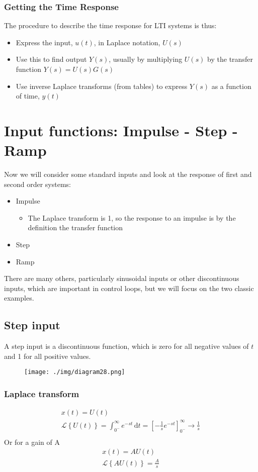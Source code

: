 \subsubsection{Getting the Time Response}
The procedure to describe the time response for LTI systems is thus:
\begin{itemize}
  \item Express the input, $u(t)$, in Laplace notation, $U(s)$
  \item Use this to find output $Y(s)$, usually by multiplying $U(s)$ by the transfer function $Y(s) = U(s)G(s)$
  \item Use inverse Laplace transforms (from tables) to express $Y(s)$ as a function of time, $y(t)$
\end{itemize}
\section{Input functions: Impulse - Step - Ramp}
Now we will consider some standard inputs and look at the response of first and second order systems:
\begin{itemize}
  \item Impulse
        \begin{itemize}
          \item The Laplace transform is 1, so the response to an impulse is by the definition the transfer function
        \end{itemize}
  \item Step
  \item Ramp
\end{itemize}
There are many others, particularly sinusoidal inputs or other discontinuous inputs, which are important in control loops, but we will focus on the two classic examples.
\subsection{Step input}
A step input is a discontinuous function, which is zero for all negative values of $t$ and 1 for all positive values.
\begin{figure}[H]
  \centering
  \texttt{[image: ./img/diagram28.png]}
\end{figure}
\subsubsection{Laplace transform}
\begin{gather}
  x(t) = U(t)\\
  \mathcal{L} \left\{ U(t) \right\} = \int_{0^-}^{\infty} e^{-st} \,\mathrm{d}t = \left[-\frac{1}{s} e^{-st}\right]_{0^-}^{\infty} \rightarrow \frac{1}{s}\\
\end{gather}
Or for a gain of A
\begin{gather}
  x(t) = AU(t) \\
  \mathcal{L} \left\{ AU(t) \right\} = \frac{A}{s}
\end{gather}
